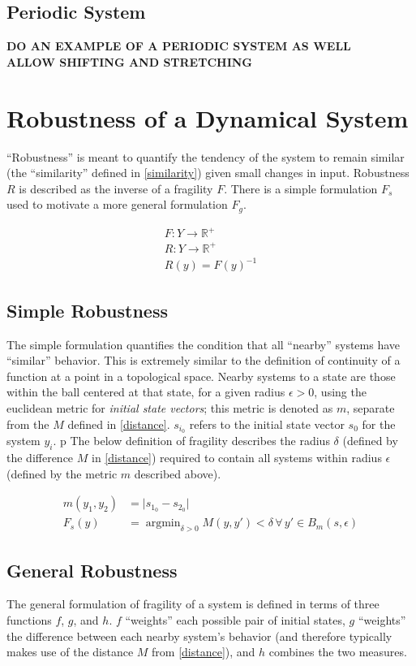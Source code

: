 \documentclass{article}
\DeclareMathOperator*{\argmin}{argmin}
\begin{document}
\subsection{Periodic System}
\textbf{DO AN EXAMPLE OF A PERIODIC SYSTEM AS WELL \\
  ALLOW SHIFTING AND STRETCHING}

\section{Robustness of a Dynamical System} \label{robustness}
``Robustness'' is meant to quantify the tendency of the system to remain similar (the ``similarity'' defined in \ref{similarity}) given small changes in input. Robustness $R$ is described as the inverse of a fragility $F$. There is a simple formulation $F_s$ used to motivate a more general formulation $F_g$.

\begin{align}
  F : Y \to \mathbb{R}^+ \\
  R : Y \to \mathbb{R}^+ \\
  R(y) = F(y)^{-1}
\end{align}

\subsection{Simple Robustness}
The simple formulation quantifies the condition that all ``nearby'' systems have ``similar'' behavior. This is extremely similar to the definition of continuity of a function at a point in a topological space. Nearby systems to a state are those within the ball centered at that state, for a given radius $\epsilon > 0$, using the euclidean metric for \textit{initial state vectors}; this metric is denoted as $m$, separate from the $M$ defined in \eqref{distance}. $s_{i_0}$ refers to the initial state vector $s_0$ for the system $y_i$.
p
The below definition of fragility describes the radius $\delta$ (defined by the difference $M$ in \eqref{distance}) required to contain all systems within radius $\epsilon$ (defined by the metric $m$ described above).

\begin{align}
  m(y_1, y_2) &= \lvert s_{1_0} - s_{2_0} \rvert \label{example-metric} \\
  F_s(y) &= \argmin_{\delta > 0} M(y, y') < \delta \,\forall\, y' \in B_m(s, \epsilon)
\end{align}

\subsection{General Robustness} \label{general-robustness}
The general formulation of fragility of a system is defined in terms of three functions $f$, $g$, and $h$. $f$ ``weights'' each possible pair of initial states, $g$ ``weights'' the difference between each nearby system's behavior (and therefore typically makes use of the distance $M$ from \eqref{distance}), and $h$ combines the two measures.
\end{document}
